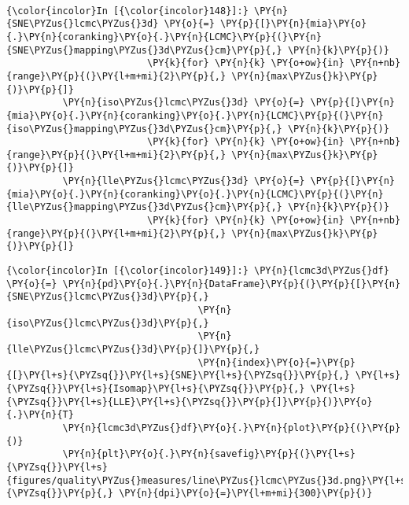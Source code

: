     \begin{center}
    \end{center}
    { \hspace*{\fill} \\}

    \begin{Verbatim}[commandchars=\\\{\}]
{\color{incolor}In [{\color{incolor}148}]:} \PY{n}{SNE\PYZus{}lcmc\PYZus{}3d} \PY{o}{=} \PY{p}{[}\PY{n}{mia}\PY{o}{.}\PY{n}{coranking}\PY{o}{.}\PY{n}{LCMC}\PY{p}{(}\PY{n}{SNE\PYZus{}mapping\PYZus{}3d\PYZus{}cm}\PY{p}{,} \PY{n}{k}\PY{p}{)}
                         \PY{k}{for} \PY{n}{k} \PY{o+ow}{in} \PY{n+nb}{range}\PY{p}{(}\PY{l+m+mi}{2}\PY{p}{,} \PY{n}{max\PYZus{}k}\PY{p}{)}\PY{p}{]}
          \PY{n}{iso\PYZus{}lcmc\PYZus{}3d} \PY{o}{=} \PY{p}{[}\PY{n}{mia}\PY{o}{.}\PY{n}{coranking}\PY{o}{.}\PY{n}{LCMC}\PY{p}{(}\PY{n}{iso\PYZus{}mapping\PYZus{}3d\PYZus{}cm}\PY{p}{,} \PY{n}{k}\PY{p}{)}
                         \PY{k}{for} \PY{n}{k} \PY{o+ow}{in} \PY{n+nb}{range}\PY{p}{(}\PY{l+m+mi}{2}\PY{p}{,} \PY{n}{max\PYZus{}k}\PY{p}{)}\PY{p}{]}
          \PY{n}{lle\PYZus{}lcmc\PYZus{}3d} \PY{o}{=} \PY{p}{[}\PY{n}{mia}\PY{o}{.}\PY{n}{coranking}\PY{o}{.}\PY{n}{LCMC}\PY{p}{(}\PY{n}{lle\PYZus{}mapping\PYZus{}3d\PYZus{}cm}\PY{p}{,} \PY{n}{k}\PY{p}{)}
                         \PY{k}{for} \PY{n}{k} \PY{o+ow}{in} \PY{n+nb}{range}\PY{p}{(}\PY{l+m+mi}{2}\PY{p}{,} \PY{n}{max\PYZus{}k}\PY{p}{)}\PY{p}{]}
\end{Verbatim}

    \begin{Verbatim}[commandchars=\\\{\}]
{\color{incolor}In [{\color{incolor}149}]:} \PY{n}{lcmc3d\PYZus{}df} \PY{o}{=} \PY{n}{pd}\PY{o}{.}\PY{n}{DataFrame}\PY{p}{(}\PY{p}{[}\PY{n}{SNE\PYZus{}lcmc\PYZus{}3d}\PY{p}{,}
                                  \PY{n}{iso\PYZus{}lcmc\PYZus{}3d}\PY{p}{,}
                                  \PY{n}{lle\PYZus{}lcmc\PYZus{}3d}\PY{p}{]}\PY{p}{,}
                                  \PY{n}{index}\PY{o}{=}\PY{p}{[}\PY{l+s}{\PYZsq{}}\PY{l+s}{SNE}\PY{l+s}{\PYZsq{}}\PY{p}{,} \PY{l+s}{\PYZsq{}}\PY{l+s}{Isomap}\PY{l+s}{\PYZsq{}}\PY{p}{,} \PY{l+s}{\PYZsq{}}\PY{l+s}{LLE}\PY{l+s}{\PYZsq{}}\PY{p}{]}\PY{p}{)}\PY{o}{.}\PY{n}{T}
          \PY{n}{lcmc3d\PYZus{}df}\PY{o}{.}\PY{n}{plot}\PY{p}{(}\PY{p}{)}
          \PY{n}{plt}\PY{o}{.}\PY{n}{savefig}\PY{p}{(}\PY{l+s}{\PYZsq{}}\PY{l+s}{figures/quality\PYZus{}measures/line\PYZus{}lcmc\PYZus{}3d.png}\PY{l+s}{\PYZsq{}}\PY{p}{,} \PY{n}{dpi}\PY{o}{=}\PY{l+m+mi}{300}\PY{p}{)}
\end{Verbatim}

